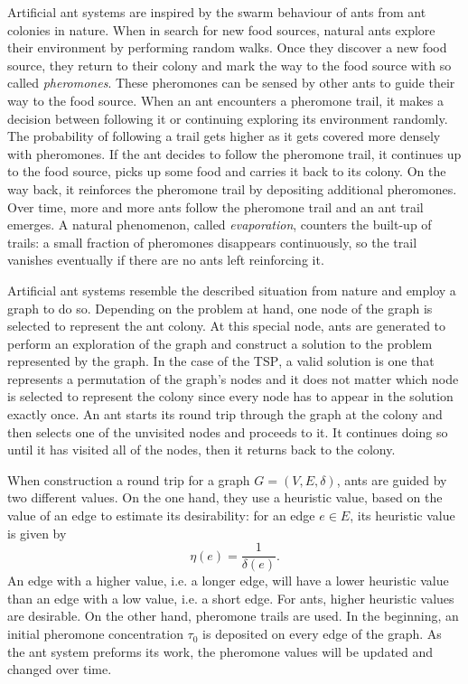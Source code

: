 Artificial ant systems are inspired by the swarm behaviour of ants from ant colonies in nature. When in search for new food sources, natural ants explore their environment by performing random walks. Once they discover a new food source, they return to their colony and mark the way to the food source with so called \textit{pheromones}. These pheromones can be sensed by other ants to guide their way to the food source. When an ant encounters a pheromone trail, it makes a decision between following it or continuing exploring its environment randomly. The probability of following a trail gets higher as it gets covered more densely with pheromones. If the ant decides to follow the pheromone trail, it continues up to the food source, picks up some food and carries it back to its colony. On the way back, it reinforces the pheromone trail by depositing additional pheromones. Over time, more and more ants follow the pheromone trail and an ant trail emerges. A natural phenomenon, called \textit{evaporation}, counters the built-up of trails: a small fraction of pheromones disappears continuously, so the trail vanishes eventually if there are no ants left reinforcing it.

Artificial ant systems resemble the described situation from nature and employ a graph to do so. Depending on the problem at hand, one node of the graph is selected to represent the ant colony. At this special node, ants are generated to perform an exploration of the graph and construct a solution to the problem represented by the graph. In the case of the \textsc{TSP}, a valid solution is one that represents a permutation of the graph's nodes and it does not matter which node is selected to represent the colony since every node has to appear in the solution exactly once. An ant starts its round trip through the graph at the colony and then selects one of the unvisited nodes and proceeds to it. It continues doing so until it has visited all of the nodes, then it returns back to the colony.

When construction a round trip for a graph $G = \left( V, E, \delta \right)$, ants are guided by two different values. On the one hand, they use a heuristic value, based on the value of an edge to estimate its desirability: for an edge $e \in E$, its heuristic value is given by
\begin{equation}
  \label{eqn:eta}
  \eta \left( e \right) = \frac{1}{\delta \left( e \right)}.
\end{equation}
An edge with a higher value, i.e. a longer edge, will have a lower heuristic value than an edge with a low value, i.e. a short edge. For ants, higher heuristic values are desirable. On the other hand, pheromone trails are used. In the beginning, an initial pheromone concentration $\tau_0$ is deposited on every edge of the graph. As the ant system preforms its work, the pheromone values will be updated and changed over time.

